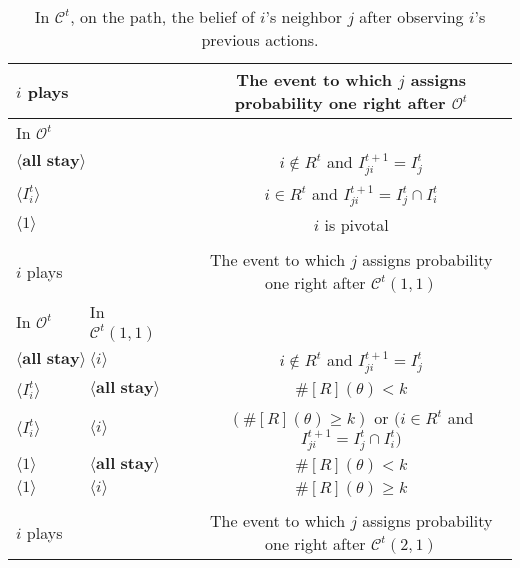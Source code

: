 \documentclass[12pt,letter]{article}
\newcommand{\Kappa}{\mathcal{C}}
\newcommand{\Omicron}{\mathcal{O}}
\theoremstyle{definition}
\theoremstyle{remark}
\theoremstyle{claim}
\begin{document}
\begin{table}[!htbp]
\caption{In $\Kappa^t$, on the path, the belief of $i$'s neighbor $j$ after observing $i$'s previous actions.}
\label{Table_blf_cdt}
\begin{center}
\begin{tabular}{l l l | c}
 $i$ plays  	&&	&	 The event to which $j$ assigns probability one right after $\Omicron^t$\\
\hline
\hline
 In $\Omicron^t$		&&&					 \\
\hline
$\langle \textbf{all stay} \rangle$  &&&     $i\notin R^t$ and $I^{t+1}_{ji}=I^t_j$ \\
$\langle I^t_{i} \rangle$  &&&     $i\in R^t$ and $I^{t+1}_{ji}=I^t_j\cap I^t_{i}$ \\
$\langle 1 \rangle$  &&& 	  $i$ is pivotal    \\
\hline
\\
 $i$ plays	&&			  & The event to which $j$ assigns probability one right after $\Kappa^t(1,1)$\\
\hline
\hline
	  In $\Omicron^t$	 	&		In $\Kappa^t(1,1)$	&		&		  \\
\hline
$\langle \textbf{all stay} \rangle$  & $\langle i \rangle$	&&    $i\notin R^t$ and $I^{t+1}_{ji}=I^t_j$  \\
$\langle I^t_{i} \rangle$  & $\langle \textbf{all stay} \rangle$	&&    $\#[R](\theta)< k$ \\
$\langle I^t_{i} \rangle$  & $\langle i \rangle$	&&   $(\#[R](\theta)\geq k )$ or $(i\in R^t$ and $I^{t+1}_{ji}=I^t_j\cap I^t_{i})$\\
$\langle 1 \rangle$  & $\langle \textbf{all stay} \rangle$	&&	  $\#[R](\theta)< k$    \\
$\langle 1 \rangle$  & $\langle i \rangle$	&&	  $\#[R](\theta)\geq k$  \\
\hline
\\
 $i$ plays  	&		&  	  &The event to which $j$ assigns probability one right after $\Kappa^t(2,1)$\\

\end{tabular}
\end{center}
\end{table}
\end{document}

